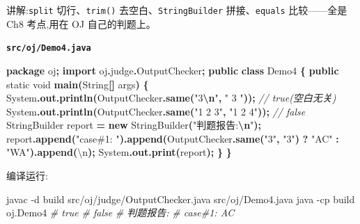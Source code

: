 \documentclass[
  11pt,
]{ctexart}
\newenvironment{Shaded}{\begin{snugshade}}{\end{snugshade}}
\newcommand{\AttributeTok}[1]{\textcolor[rgb]{0.13,0.29,0.53}{#1}}
\newcommand{\BuiltInTok}[1]{#1}
\newcommand{\CharTok}[1]{\textcolor[rgb]{0.31,0.60,0.02}{#1}}
\newcommand{\CommentTok}[1]{\textcolor[rgb]{0.56,0.35,0.01}{\textit{#1}}}
\newcommand{\DataTypeTok}[1]{\textcolor[rgb]{0.13,0.29,0.53}{#1}}
\newcommand{\ExtensionTok}[1]{#1}
\newcommand{\FunctionTok}[1]{\textcolor[rgb]{0.13,0.29,0.53}{\textbf{#1}}}
\newcommand{\ImportTok}[1]{#1}
\newcommand{\KeywordTok}[1]{\textcolor[rgb]{0.13,0.29,0.53}{\textbf{#1}}}
\newcommand{\NormalTok}[1]{#1}
\newcommand{\OperatorTok}[1]{\textcolor[rgb]{0.81,0.36,0.00}{\textbf{#1}}}
\newcommand{\SpecialCharTok}[1]{\textcolor[rgb]{0.81,0.36,0.00}{\textbf{#1}}}
\newcommand{\StringTok}[1]{\textcolor[rgb]{0.31,0.60,0.02}{#1}}
\begin{document}
讲解:\texttt{split} 切行、\texttt{trim()} 去空白、\texttt{StringBuilder}
拼接、\texttt{equals} 比较------全是 Ch8 考点,用在 OJ 自己的判题上。

\textbf{\texttt{src/oj/Demo4.java}}

\begin{Shaded}
\begin{Highlighting}[]
\KeywordTok{package}\ImportTok{ oj}\OperatorTok{;}
\KeywordTok{import} \ImportTok{oj}\OperatorTok{.}\ImportTok{judge}\OperatorTok{.}\ImportTok{OutputChecker}\OperatorTok{;}
\KeywordTok{public} \KeywordTok{class}\NormalTok{ Demo4 }\OperatorTok{\{}
    \KeywordTok{public} \DataTypeTok{static} \DataTypeTok{void} \FunctionTok{main}\OperatorTok{(}\BuiltInTok{String}\OperatorTok{[]}\NormalTok{ args}\OperatorTok{)} \OperatorTok{\{}
        \BuiltInTok{System}\OperatorTok{.}\FunctionTok{out}\OperatorTok{.}\FunctionTok{println}\OperatorTok{(}\NormalTok{OutputChecker}\OperatorTok{.}\FunctionTok{same}\OperatorTok{(}\StringTok{"3}\SpecialCharTok{\textbackslash{}n}\StringTok{"}\OperatorTok{,} \StringTok{"  3  "}\OperatorTok{));}        \CommentTok{// true(空白无关)}
        \BuiltInTok{System}\OperatorTok{.}\FunctionTok{out}\OperatorTok{.}\FunctionTok{println}\OperatorTok{(}\NormalTok{OutputChecker}\OperatorTok{.}\FunctionTok{same}\OperatorTok{(}\StringTok{"1 2 3"}\OperatorTok{,} \StringTok{"1 2 4"}\OperatorTok{));}      \CommentTok{// false}
        \BuiltInTok{StringBuilder}\NormalTok{ report }\OperatorTok{=} \KeywordTok{new} \BuiltInTok{StringBuilder}\OperatorTok{(}\StringTok{"判题报告:}\SpecialCharTok{\textbackslash{}n}\StringTok{"}\OperatorTok{);}
\NormalTok{        report}\OperatorTok{.}\FunctionTok{append}\OperatorTok{(}\StringTok{"case\#1: "}\OperatorTok{).}\FunctionTok{append}\OperatorTok{(}\NormalTok{OutputChecker}\OperatorTok{.}\FunctionTok{same}\OperatorTok{(}\StringTok{"3"}\OperatorTok{,} \StringTok{"3"}\OperatorTok{)} \OperatorTok{?} \StringTok{"AC"} \OperatorTok{:} \StringTok{"WA"}\OperatorTok{).}\FunctionTok{append}\OperatorTok{(}\CharTok{\textquotesingle{}\textbackslash{}n\textquotesingle{}}\OperatorTok{);}
        \BuiltInTok{System}\OperatorTok{.}\FunctionTok{out}\OperatorTok{.}\FunctionTok{print}\OperatorTok{(}\NormalTok{report}\OperatorTok{);}
    \OperatorTok{\}}
\OperatorTok{\}}
\end{Highlighting}
\end{Shaded}

编译运行:

\begin{Shaded}
\begin{Highlighting}[]
\ExtensionTok{javac} \AttributeTok{{-}d}\NormalTok{ build src/oj/judge/OutputChecker.java src/oj/Demo4.java}
\ExtensionTok{java} \AttributeTok{{-}cp}\NormalTok{ build oj.Demo4}
\CommentTok{\# true}
\CommentTok{\# false}
\CommentTok{\# 判题报告:}
\CommentTok{\# case\#1: AC}
\end{Highlighting}
\end{Shaded}
\end{document}
